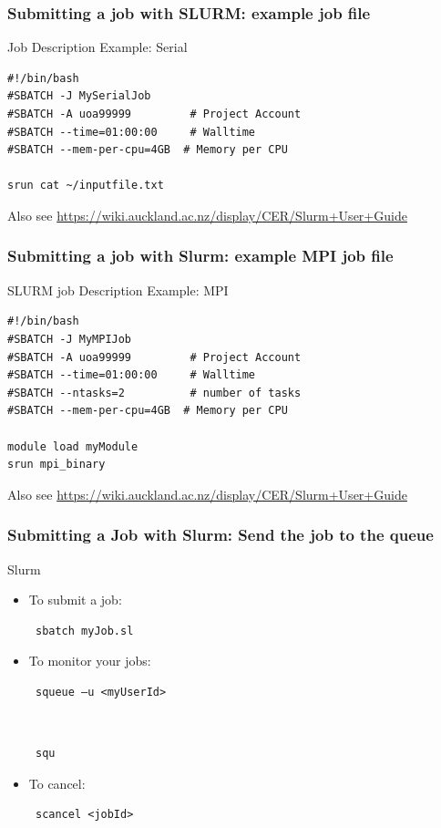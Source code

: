 \documentclass{beamer}
\begin{document}
\begin{frame}
  \frametitle{Submitting a job with SLURM: example job file}
\begin{block}{Job Description Example: Serial}
\begin{scriptsize}
\begin{verbatim}
#!/bin/bash
#SBATCH -J MySerialJob
#SBATCH -A uoa99999         # Project Account
#SBATCH --time=01:00:00     # Walltime
#SBATCH --mem-per-cpu=4GB  # Memory per CPU 

srun cat ~/inputfile.txt
\end{verbatim}
\end{scriptsize}
  \end{block}
{\tiny Also see \url{https://wiki.auckland.ac.nz/display/CER/Slurm+User+Guide}}
\end{frame}


\begin{frame}
  \frametitle{Submitting a job with Slurm: example MPI job file}
     \begin{block}{SLURM job Description Example: MPI}
\begin{scriptsize}
\begin{verbatim}
#!/bin/bash
#SBATCH -J MyMPIJob
#SBATCH -A uoa99999         # Project Account
#SBATCH --time=01:00:00     # Walltime
#SBATCH --ntasks=2          # number of tasks
#SBATCH --mem-per-cpu=4GB  # Memory per CPU

module load myModule
srun mpi_binary
\end{verbatim}
\end{scriptsize}
  \end{block}
  
{\tiny Also see \url{https://wiki.auckland.ac.nz/display/CER/Slurm+User+Guide}}
\end{frame}


\begin{frame}[fragile]

  \frametitle{Submitting a Job with Slurm: Send the job to the queue}
   \begin{block}{Slurm}
     \begin{itemize}%
	\item To submit a job:\\ \begin{verbatim} sbatch myJob.sl \end{verbatim}
	\item To monitor your jobs:\\ \begin{verbatim} squeue –u <myUserId>\end{verbatim}\\ 
	  \begin{verbatim} squ \end{verbatim}
	\item To cancel:\\ \begin{verbatim} scancel <jobId>\end{verbatim}
     \end{itemize}
  \end{block}
\end{frame}
\end{document}
